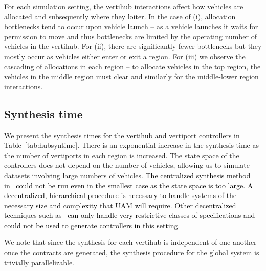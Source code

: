 For each simulation setting, the vertihub interactions affect how vehicles are allocated and subsequently where they loiter.
In the case of (i), allocation bottlenecks tend to occur upon vehicle launch -- as a vehicle launches it waits for permission to move and thus bottlenecks are limited by the operating number of vehicles in the vertihub.
For (ii), there are significantly fewer bottlenecks but they mostly occur as vehicles either enter or exit a region.
For (iii) we observe the cascading of allocations in each region -- to allocate vehicles in the top region, the vehicles in the middle region must clear and similarly for the middle-lower region interactions.

\subsection{Synthesis time}

We present the synthesis times for the vertihub and vertiport controllers in Table~\ref{tab:hubsyntime}. 
There is an exponential increase in the synthesis time as the number of vertiports in each region is increased.
The state space of the controllers does not depend on the number of vehicles, allowing us to simulate datasets involving large numbers of vehicles. \textcolor{black}{
The centralized synthesis method in~\cite{bh18} could not be run even in the smallest case as the state space is too large. A decentralized, hierarchical procedure is necessary to handle systems of the necessary size and complexity that UAM will require. Other decentralized techniques such as~\cite{bhnfm} can only handle very restrictive classes of specifications and could not be used to generate controllers in this setting.}

We note that since the synthesis for each vertihub is independent of one another once the contracts are generated, the synthesis procedure for the global system is trivially parallelizable. 




